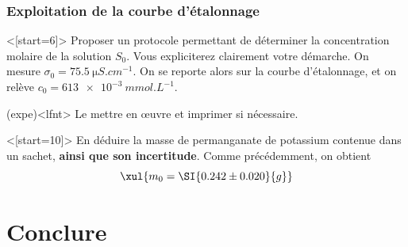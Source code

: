 \documentclass[../main/main.tex]{subfiles}
\begin{document}
\subsubsection{Exploitation de la courbe d'étalonnage}

\QR<[start=6]>{%
	Proposer un protocole permettant de déterminer la concentration molaire de la
	solution $S_0$. Vous expliciterez clairement votre démarche.
}{%
	On mesure $\sigma_0 = \SI{75.5}{\micro S.cm^{-1}}$. On se reporte alors sur la
	courbe d'étalonnage, et on relève $c_0 = \SI{613e-3}{mmol.L^{-1}}$.
}

\begin{tcb}(expe)<lfnt>{}
	Le mettre en œuvre et imprimer si nécessaire.
\end{tcb}

\QR<[start=10]>{%
	En déduire la masse de permanganate de potassium contenue dans un sachet,
	\textbf{ainsi que son incertitude}.
}{%
	Comme précédemment, on obtient
	\[
		\xul{m_0 = \SI{0.242 \pm 0.020}{g}}
	\]
}


\section{Conclure}

\end{document}
